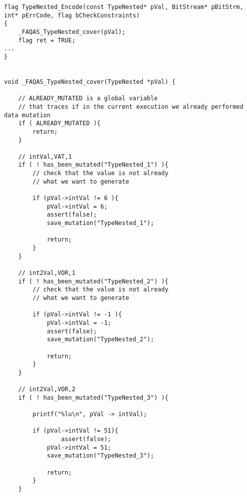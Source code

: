 \begin{lstlisting}[style=CStyle, caption=Example of data-driven mutation probe for ASN.1 that has been added to the encoding function., label=ASN_encodeReachable]
flag TypeNested_Encode(const TypeNested* pVal, BitStream* pBitStrm, int* pErrCode, flag bCheckConstraints)
{
    _FAQAS_TypeNested_cover(pVal);
    flag ret = TRUE;
...
}


void _FAQAS_TypeNested_cover(TypeNested *pVal) {

	// ALREADY_MUTATED is a global variable 
	// that traces if in the current execution we already performed data mutation
	if ( ALREADY_MUTATED ){
		return;
	}
	
	// intVal,VAT,1
	if ( ! has_been_mutated("TypeNested_1") ){
		// check that the value is not already 
		// what we want to generate

		if (pVal->intVal != 6 ){
			pVal->intVal = 6;
			assert(false);
			save_mutation("TypeNested_1");

			return;
		}
	}
	
	// int2Val,VOR,1
	if ( ! has_been_mutated("TypeNested_2") ){
		// check that the value is not already 
		// what we want to generate

		if (pVal->intVal != -1 ){
			pVal->intVal = -1;
			assert(false);
			save_mutation("TypeNested_2");

			return;
		}
	}

	// int2Val,VOR,2
	if ( ! has_been_mutated("TypeNested_3") ){

        printf("%lu\n", pVal -> intVal);

        if (pVal->intVal != 51){
        	    assert(false);	
            pVal->intVal = 51;
            save_mutation("TypeNested_3");

            return;
        }
    }


\end{lstlisting}



%
%
%
